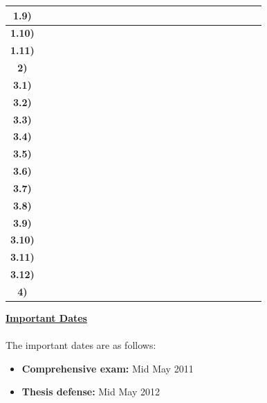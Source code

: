\documentclass[a4,12pt]{report}
\newcommand{\X}{\cellcolor[gray]{0.5}}
\newcommand{\x}{\cellcolor[gray]{0.8}}
\begin{document}
\begin{table}[bt]
{\begin{tabular}{|c|c||c|c||c|c||c||c|c|c|c||c|c|c|c||c|}
\textbf{1.9)} & ~ & ~ & ~ & ~ & ~ & ~ & ~ & ~ & ~ & ~ & ~ & \X & \X & ~ & \\ \hline
\textbf{1.10)}& ~ & ~ & ~ & ~ & ~ & ~ & ~ & ~ & ~ & ~ & ~ & ~ & \X  & ~ & \\ \hline
\textbf{1.11)}& ~ & ~ & ~ & ~ & ~ & ~ & ~ & ~ & ~ & ~ & ~ & ~ & \X & ~ & \\ \toprule[0.1em] \bottomrule[0.1em]
\textbf{2)}   & ~ & ~ & \X & \X & ~ & ~ & ~ & ~ & ~ & ~ & ~ & ~ & ~ & ~ & \\ \toprule[0.1em] \bottomrule[0.1em]
\textbf{3.1)} & \X & ~ & ~ & ~ & ~ & ~ & ~ & ~ & ~ & ~ & ~ & ~ & ~ & ~ & \\ \hline
\textbf{3.2)} & \x & ~ & ~ & ~ & \X & ~ & ~ & ~ & ~ & ~ & ~ & ~ & ~ & ~ & \\ \hline
\textbf{3.3)} & \x & ~ & ~ & ~ & \X & ~ & ~ & ~ & ~ & ~ & ~ & ~ & ~ & ~ & \\ \hline
\textbf{3.4)} & \X & ~ & ~ & ~ & ~ & ~ & ~ & ~ & ~ & ~ & ~ & ~ & ~ & ~ & \\ \hline
\textbf{3.5)} & ~ & ~ & ~ & \X & \X & ~ & ~ & ~ & ~ & ~ & ~ & ~ & ~ & ~ & \\ \hline
\textbf{3.6)} & ~ & ~ & ~ & \X & \X & ~ & ~ & ~ & ~ & ~ & ~ & ~ & ~ & ~ & \\ \hline
\textbf{3.7)} & ~ & ~ & ~ & ~ & ~ & \X & \X & \X & ~ & ~ & ~ & ~ & ~ & ~ & \\ \hline
\textbf{3.8)} & ~ & ~ & ~ & ~ & ~ & ~ & ~ & \X & ~ & ~ & ~ & ~ & ~ & ~ & \\ \hline
\textbf{3.9)} & ~ & ~ & ~ & ~ & ~ & ~ & ~ & ~ & \X & \X & \X & ~ & ~ & ~ & \X \\ \hline
\textbf{3.10)} & ~ & ~ & ~ & ~ & ~ & ~ & ~ & ~ & ~ & ~ & \X & \X & ~ & ~ & \X \\ \hline
\textbf{3.11)} & ~ & ~ & ~ & ~ & ~ & ~ & ~ & ~ & ~ & ~ & ~ & ~ & \X & ~ & \\ \hline
\textbf{3.12)} & ~ & ~ & ~ & ~ & ~ & ~ & ~ & ~ & ~ & ~ & ~ & ~ & ~ & ~ & \X \\ \toprule[0.1em] \bottomrule[0.1em]
\textbf{4)} & ~ & ~ & ~ & ~ & ~ & ~ & ~ & ~ & ~ & ~ & ~ & ~ & ~ & \X &  \\ \hline
\end{tabular}
}
\normalsize
\label{t:timetable}
\end{table}

\large\underline{\textbf{Important Dates}}\\\\
\normalsize
The important dates are as follows:
\begin{itemize}
\item \textbf{Comprehensive exam:} Mid May 2011
\item\textbf{Thesis defense:} Mid May 2012
\end{itemize}


{\small }
\end{document}
